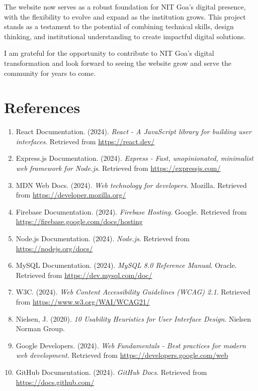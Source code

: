 \documentclass[12pt,a4paper]{report}
\begin{document}
\vspace{0.5cm}

The website now serves as a robust foundation for NIT Goa's digital presence, with the flexibility to evolve and expand as the institution grows. This project stands as a testament to the potential of combining technical skills, design thinking, and institutional understanding to create impactful digital solutions.

\vspace{0.5cm}

I am grateful for the opportunity to contribute to NIT Goa's digital transformation and look forward to seeing the website grow and serve the community for years to come.

\chapter*{References}

\begin{enumerate}
    \item React Documentation. (2024). \textit{React - A JavaScript library for building user interfaces}. Retrieved from \url{https://react.dev/}
    
    \item Express.js Documentation. (2024). \textit{Express - Fast, unopinionated, minimalist web framework for Node.js}. Retrieved from \url{https://expressjs.com/}
    
    \item MDN Web Docs. (2024). \textit{Web technology for developers}. Mozilla. Retrieved from \url{https://developer.mozilla.org/}
    
    \item Firebase Documentation. (2024). \textit{Firebase Hosting}. Google. Retrieved from \url{https://firebase.google.com/docs/hosting}
    
    \item Node.js Documentation. (2024). \textit{Node.js}. Retrieved from \url{https://nodejs.org/docs/}
    
    \item MySQL Documentation. (2024). \textit{MySQL 8.0 Reference Manual}. Oracle. Retrieved from \url{https://dev.mysql.com/doc/}
    
    \item W3C. (2024). \textit{Web Content Accessibility Guidelines (WCAG) 2.1}. Retrieved from \url{https://www.w3.org/WAI/WCAG21/}
    
    \item Nielsen, J. (2020). \textit{10 Usability Heuristics for User Interface Design}. Nielsen Norman Group.
    
    \item Google Developers. (2024). \textit{Web Fundamentals - Best practices for modern web development}. Retrieved from \url{https://developers.google.com/web}
    
    \item GitHub Documentation. (2024). \textit{GitHub Docs}. Retrieved from \url{https://docs.github.com/}
\end{enumerate}
\end{document}
